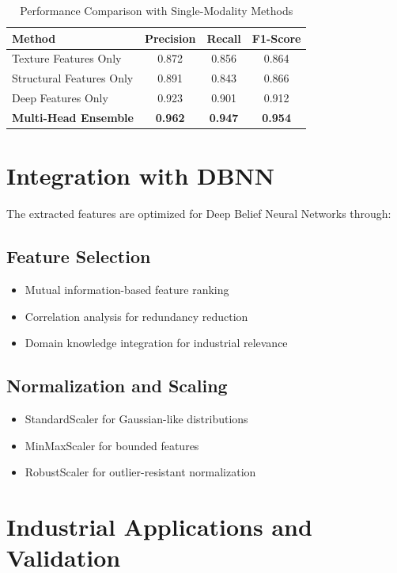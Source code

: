 \documentclass[12pt,a4paper]{article}
\begin{document}
\begin{table}[h!]
\centering
\caption{Performance Comparison with Single-Modality Methods}
\label{tab:comparison}
\begin{tabular}{@{}lccc@{}}
\toprule
\textbf{Method} & \textbf{Precision} & \textbf{Recall} & \textbf{F1-Score} \\
\midrule
Texture Features Only & 0.872 & 0.856 & 0.864 \\
Structural Features Only & 0.891 & 0.843 & 0.866 \\
Deep Features Only & 0.923 & 0.901 & 0.912 \\
\textbf{Multi-Head Ensemble} & \textbf{0.962} & \textbf{0.947} & \textbf{0.954} \\
\bottomrule
\end{tabular}
\end{table}

\section{Integration with DBNN}

The extracted features are optimized for Deep Belief Neural Networks through:

\subsection{Feature Selection}
\begin{itemize}
    \item Mutual information-based feature ranking
    \item Correlation analysis for redundancy reduction
    \item Domain knowledge integration for industrial relevance
\end{itemize}

\subsection{Normalization and Scaling}
\begin{itemize}
    \item StandardScaler for Gaussian-like distributions
    \item MinMaxScaler for bounded features
    \item RobustScaler for outlier-resistant normalization
\end{itemize}

\section{Industrial Applications and Validation}
\end{document}
